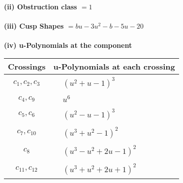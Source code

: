 \documentclass[1p]{elsarticle_modified}
\theoremstyle{definition}
\begin{document}
\flushleft \textbf{(ii) Obstruction class $= 1$}\\~\\
\flushleft \textbf{(iii) Cusp Shapes $= b u-3 u^2- b-5 u-20$}\\~\\
\newpage\renewcommand{\arraystretch}{1}
\flushleft \textbf{(iv) u-Polynomials at the component}\newline \\
\begin{tabular}{m{50pt}|m{274pt}}
Crossings & \hspace{64pt}u-Polynomials at each crossing \\
\hline $$\begin{aligned}c_{1},c_{2},c_{3}\end{aligned}$$&$\begin{aligned}
&(u^2+u-1)^3
\end{aligned}$\\
\hline $$\begin{aligned}c_{4},c_{9}\end{aligned}$$&$\begin{aligned}
&u^6
\end{aligned}$\\
\hline $$\begin{aligned}c_{5},c_{6}\end{aligned}$$&$\begin{aligned}
&(u^2- u-1)^3
\end{aligned}$\\
\hline $$\begin{aligned}c_{7},c_{10}\end{aligned}$$&$\begin{aligned}
&(u^3+u^2-1)^2
\end{aligned}$\\
\hline $$\begin{aligned}c_{8}\end{aligned}$$&$\begin{aligned}
&(u^3- u^2+2 u-1)^2
\end{aligned}$\\
\hline $$\begin{aligned}c_{11},c_{12}\end{aligned}$$&$\begin{aligned}
&(u^3+u^2+2 u+1)^2
\end{aligned}$\\
\hline
\end{tabular}\\~\\
\end{document}
